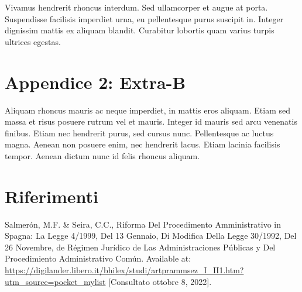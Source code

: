 \documentclass[12pt,it,a4paper,]{report}
\newlength{\cslhangindent}
\newenvironment{CSLReferences}[2] %
 {%
  \setlength{\parindent}{0pt}
  \ifodd #1 \everypar{\setlength{\hangindent}{\cslhangindent}}\ignorespaces\fi
  \ifnum #2 > 0
  \setlength{\parskip}{#2\baselineskip}
  \fi
 }%
 {}
\begin{document}
Vivamus hendrerit rhoncus interdum. Sed ullamcorper et augue at porta.
Suspendisse facilisis imperdiet urna, eu pellentesque purus suscipit in.
Integer dignissim mattis ex aliquam blandit. Curabitur lobortis quam
varius turpis ultrices egestas.

\hypertarget{appendice-2-extra-b}{%
\chapter*{Appendice 2: Extra-B}\label{appendice-2-extra-b}}

Aliquam rhoncus mauris ac neque imperdiet, in mattis eros aliquam. Etiam
sed massa et risus posuere rutrum vel et mauris. Integer id mauris sed
arcu venenatis finibus. Etiam nec hendrerit purus, sed cursus nunc.
Pellentesque ac luctus magna. Aenean non posuere enim, nec hendrerit
lacus. Etiam lacinia facilisis tempor. Aenean dictum nunc id felis
rhoncus aliquam.

\footnotesize
\singlespacing
\setlength{\parindent}{0in}

\hypertarget{riferimenti}{%
\chapter*{Riferimenti}\label{riferimenti}}

\hypertarget{refs}{}
\begin{CSLReferences}{1}{0}
\leavevmode{}%
Salmerón, M.F. \& Seira, C.C., Riforma Del Procedimento Amministrativo
in {Spagna}: La {Legge} 4/1999, Del 13 Gennaio, Di Modifica Della
{Legge} 30/1992, Del 26 Novembre, de {Régimen Jurídico} de Las
{Administraciones Públicas} y Del {Procedimiento Administrativo Común}.
Available at:
\url{https://digilander.libero.it/bhilex/studi/artprammsez_I_II1.htm?utm_source=pocket_mylist}
{[}Consultato ottobre 8, 2022{]}.

\end{CSLReferences}
\end{document}
